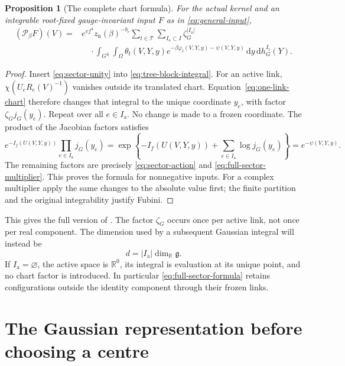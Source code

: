 \documentclass[11pt,reqno]{amsart}
\numberwithin{equation}{section}
\newtheorem{proposition}[theorem]{Proposition}
\theoremstyle{definition}
\theoremstyle{remark}
\newcommand{\R}{\mathbb R}
\newcommand{\dd}{\mathrm d}
\newcommand{\g}{\mathfrak g}
\newcommand{\Ia}{I_{\mathrm a}}
\newcommand{\If}{I_{\mathrm f}}
\begin{document}
\begin{proposition}[The complete chart formula]
\label{prop:sector-formula}
For the actual kernel and an integrable root-fixed gauge-invariant
input \(F\) as in \eqref{eq:general-input},
\begin{equation}
 \begin{split}
 (\mathcal P_\beta F)(V)
 ={}&e^{vf^4}z_{\mathrm n}(\beta)^{-b_c}
       \sum_{t\in\mathcal T}\sum_{\Ia\subset I}\zeta_G^{|\Ia|}\\
 &\quad\cdot\int_{G^{\If}}\int_\Omega
       \theta_t(V,Y,y)e^{-\beta\varphi_t(V,Y,y)-\psi(V,Y,y)}
                                   \,\dd y\,\dd h_G^{\If}(Y).
 \end{split}
 \label{eq:full-sector-formula}
\end{equation}
\end{proposition}
\begin{proof}
Insert \eqref{eq:sector-unity} into \eqref{eq:tree-block-integral}.
For an active link, \(\chi(U_eR_e(V)^{-1})\) vanishes outside its
translated chart. Equation~\eqref{eq:one-link-chart} therefore
changes that integral to the unique coordinate \(y_e\), with factor
\(\zeta_Gj_G(y_e)\). Repeat over all \(e\in\Ia\).
No change is made to a frozen coordinate. The product of the
Jacobian factors satisfies
\[
 e^{-I_f(U(V,Y,y))}\prod_{e\in\Ia}j_G(y_e)
       =\exp\left\{-I_f(U(V,Y,y))
                         +\sum_{e\in\Ia}\log j_G(y_e)\right\}
       =e^{-\psi(V,Y,y)}.
\]
The remaining factors are precisely
\eqref{eq:sector-action} and \eqref{eq:full-sector-multiplier}.
This proves the formula for nonnegative inputs. For a complex
multiplier apply the same changes to the absolute value first;
the finite partition and the original integrability justify Fubini.
\end{proof}

This gives the full version of \cite[(11.8)--(11.9), p.~38]{Main}.
The factor \(\zeta_G\) occurs once per active link, not once per
real component. The dimension used by a subsequent Gaussian
integral will instead be
\begin{equation}
                         d=|\Ia|\dim_{\R}\g.
 \label{eq:active-dimension}
\end{equation}
If \(\Ia=\varnothing\), the active space is \(\R^0\), its integral
is evaluation at its unique point, and no chart factor is introduced.
In particular \eqref{eq:full-sector-formula} retains configurations
outside the identity component through their frozen links.

\section{The Gaussian representation before choosing a centre}
\label{sec:gaussian}
\end{document}
